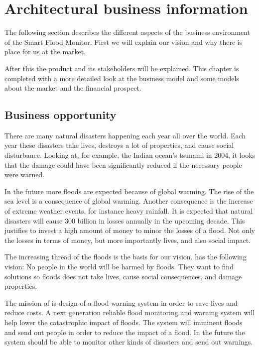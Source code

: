
\clearpage
\chapter{Architectural business information}
\label{ch:business}
The following section describes the different aspects of the business environment of the Smart Flood Monitor. First we will explain our vision and why there is place for us at the market.
 
After this the product and its stakeholders will be explained. This chapter is completed with a more detailed look at the business model and some models about the market and the financial prospect.

\section{Business opportunity}
There are many natural disasters happening each year all over the world. Each year these disasters take lives, destroys a lot of properties, and cause social disturbance.
Looking at, for example, the Indian ocean's tsunami in 2004, it looks that the damage could have been significantly reduced if the necessary people were warned\cite{tsunami10ylater, tsunamiwarnsavelives}.  %

In the future more floods are expected because of global warming\cite{climateincrease}. The rise of the sea level is a consequence of global warming. Another consequence is the increase of extreme weather events, for instance heavy rainfall. It is expected that natural disasters will cause 300 billion in losses annually in the upcoming decade\cite{disastercosts}. This justifies to invest a high amount of money to minor the losses of a flood. Not only the losses in terms of money, but more importantly lives, and also social impact.

The increasing thread of the floods is the basis for our vision. \CompanyName has the following vision: No people in the world will be harmed by floods. They want to find solutions so floods does not take lives, cause social consequences, and damage properties.   

The mission of \CompanyName is design of a flood warning system in order to save lives and reduce costs. A next generation reliable flood monitoring and warning system will help lower the catastrophic impact of floods. The system will imminent floods and send out people in order to reduce the impact of a flood. In the future the system should be able to monitor other kinds of disasters and send out warnings. 

